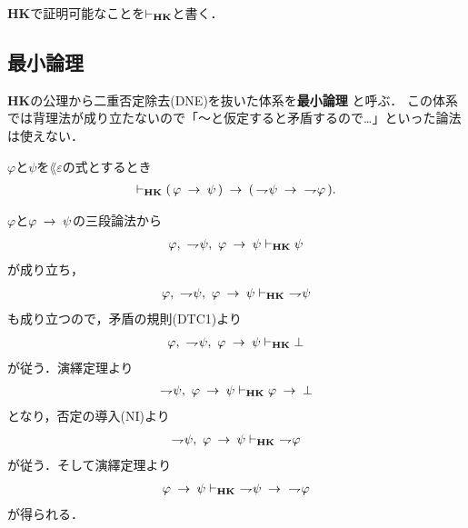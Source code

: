 	{\bf HK}で証明可能なことを$\vdash_{{\scriptsize \mbox{{\bf HK}}}}$と書く．
	
\subsection{最小論理}
	{\bf HK}の公理から二重否定除去(DNE)を抜いた体系を{\bf 最小論理}
	と呼ぶ．
	この体系では背理法が成り立たないので「～と仮定すると矛盾するので…」といった論法は使えない．
	
	\begin{screen}
		\begin{thm}[対偶律$1$]\label{classic:contraposition_1}
			$\varphi$と$\psi$を$\lang{\varepsilon}$の式とするとき
			\begin{align}
				\vdash_{{\scriptsize \mbox{{\bf HK}}}} (\, \varphi \hspace{0.25em}\rightarrow\hspace{0.25em} \psi\, )
				\hspace{0.25em}\rightarrow\hspace{0.25em} (\, \rightharpoondown\hspace{-0.25em} \psi \hspace{0.25em}\rightarrow\hspace{0.25em}\ \rightharpoondown\hspace{-0.25em} \varphi\, ).
			\end{align}
		\end{thm}
	\end{screen}
	
	\begin{sketch}
		$\varphi$と$\varphi \hspace{0.25em}\rightarrow\hspace{0.25em} \psi$の三段論法から
		\begin{align}
			\varphi,\ \rightharpoondown\hspace{-0.25em} \psi,\ \varphi \hspace{0.25em}\rightarrow\hspace{0.25em} \psi
			\vdash_{{\scriptsize \mbox{{\bf HK}}}} \psi
		\end{align}
		が成り立ち，
		\begin{align}
			\varphi,\ \rightharpoondown\hspace{-0.25em} \psi,\ \varphi \hspace{0.25em}\rightarrow\hspace{0.25em} \psi
			\vdash_{{\scriptsize \mbox{{\bf HK}}}}\ \rightharpoondown\hspace{-0.25em} \psi
		\end{align}
		も成り立つので，矛盾の規則(DTC1)より
		\begin{align}
			\varphi,\ \rightharpoondown\hspace{-0.25em} \psi,\ \varphi \hspace{0.25em}\rightarrow\hspace{0.25em} \psi
			\vdash_{{\scriptsize \mbox{{\bf HK}}}} \bot
		\end{align}
		が従う．演繹定理より
		\begin{align}
			\rightharpoondown\hspace{-0.25em} \psi,\ \varphi \hspace{0.25em}\rightarrow\hspace{0.25em} \psi
			\vdash_{{\scriptsize \mbox{{\bf HK}}}} \varphi \hspace{0.25em}\rightarrow\hspace{0.25em} \bot
		\end{align}
		となり，否定の導入(NI)より
		\begin{align}
			\rightharpoondown\hspace{-0.25em} \psi,\ \varphi \hspace{0.25em}\rightarrow\hspace{0.25em} \psi
			\vdash_{{\scriptsize \mbox{{\bf HK}}}}\ \rightharpoondown\hspace{-0.25em} \varphi
		\end{align}
		が従う．そして演繹定理より
		\begin{align}
			\varphi \rarrow \psi
			\provable{\mbox{{\bf HK}}}\ \negation \psi \rarrow\ \negation \varphi
		\end{align}
		が得られる．
		\QED
	\end{sketch}
	
